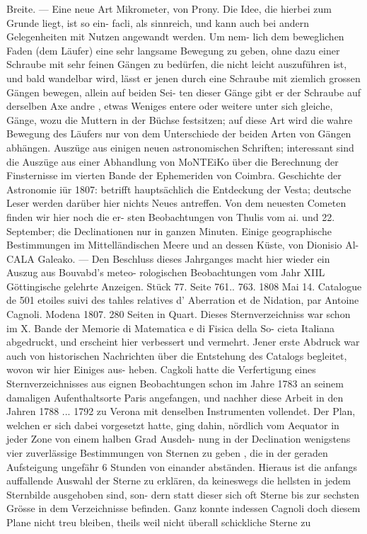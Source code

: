 \documentclass[12pt,a4paper]{article}
\begin{document}
Breite.  ---  Eine  neue  Art  Mikrometer,  von  Prony.  Die  Idee,  die  hierbei  zum  Grunde  liegt,  ist  so  ein- facli,  als  sinnreich,  und  kann  auch  bei  andern  Gelegenheiten  mit  Nutzen  angewandt  werden.  Um  nem- lich  dem  beweglichen  Faden  (dem  Läufer)  eine  sehr  langsame  Bewegung  zu  geben,  ohne  dazu  einer Schraube  mit  sehr  feinen  Gängen  zu  bedürfen,  die  nicht  leicht  auszuführen  ist,  und  bald  wandelbar wird,  lässt  er  jenen  durch  eine  Schraube  mit  ziemlich  grossen  Gängen  bewegen,  allein  auf  beiden  Sei- ten dieser  Gänge  gibt  er  der  Schraube  auf  derselben  Axe  andre ,  etwas  Weniges  entere  oder  weitere unter  sich  gleiche,  Gänge,   wozu  die  Muttern  in  der  Büchse  festsitzen;    auf  diese  Art   wird   die  wahre Bewegung  des  Läufers  nur  von  dem  Unterschiede  der  beiden  Arten  von  Gängen  abhängen.       Auszüge aus  einigen  neuen  astronomischen  Schriften;    interessant   sind   die  Auszüge  aus   einer   Abhandlung   von MoNTEiKo  über   die  Berechnung   der  Finsternisse  im  vierten  Bande  der  Ephemeriden  von   Coimbra. Geschichte  der  Astronomie  iür  1807:  betrifft  hauptsächlich  die  Entdeckung  der  Vesta;  deutsche  Leser werden  darüber  hier  nichts  Neues  antreffen.  Von  dem  neuesten  Cometen  finden  wir  hier  noch  die  er- sten Beobachtungen  von  Thulis  vom  ai.  und  22.  September;  die  Declinationen  nur  in  ganzen  Minuten. Einige  geographische  Bestimmungen  im  Mittelländischen  Meere  und  an  dessen  Küste,  von  Dionisio  Al- CALA  Galeako.  ---  Den  Beschluss  dieses  Jahrganges  macht  hier  wieder  ein  Auszug  aus  Bouvabd's  meteo- rologischen Beobachtungen  vom  Jahr  XIIL Göttingische  gelehrte  Anzeigen.     Stück  77.     Seite  761.. 763.     1808  Mai  14. Catalogue  de  501  etoiles  suivi  des  tahles  relatives  d' Aberration  et  de  Nidation,  par  Antoine  Cagnoli. Modena  1807.    280  Seiten  in  Quart. Dieses  Sternverzeichniss  war  schon  im  X.  Bande  der  Memorie  di  Matematica  e  di  Fisica  della  So- cieta  Italiana  abgedruckt,  und  erscheint  hier  verbessert  und  vermehrt.  Jener  erste  Abdruck  war  auch von  historischen  Nachrichten  über  die  Entstehung  des  Catalogs  begleitet,  wovon  wir  hier  Einiges  aus- heben. Cagkoli  hatte  die  Verfertigung  eines  Sternverzeichnisses  aus  eignen  Beobachtungen  schon  im Jahre  1783  an  seinem  damaligen  Aufenthaltsorte  Paris  angefangen,  und  nachher  diese  Arbeit  in  den Jahren  1788  ...  1792  zu  Verona  mit  denselben  Instrumenten  vollendet.  Der  Plan,  welchen  er  sich  dabei vorgesetzt  hatte,  ging  dahin,  nördlich  vom  Aequator  in  jeder  Zone  von  einem  halben  Grad  Ausdeh- nung in  der  Declination  wenigstens  vier  zuverlässige  Bestimmungen  von  Sternen  zu  geben ,  die  in  der geraden  Aufsteigung  ungefähr  6  Stunden  von  einander  abständen.  Hieraus  ist  die  anfangs  auffallende Auswahl  der  Sterne  zu  erklären,  da  keineswegs  die  hellsten  in  jedem  Sternbilde  ausgehoben  sind,  son- dern statt  dieser  sich  oft  Sterne  bis  zur  sechsten  Grösse  in  dem  Verzeichnisse  befinden.  Ganz  konnte indessen  Cagnoli  doch  diesem  Plane  nicht  treu  bleiben,  theils  weil  nicht  überall  schickliche  Sterne  zu 
\end{document}
